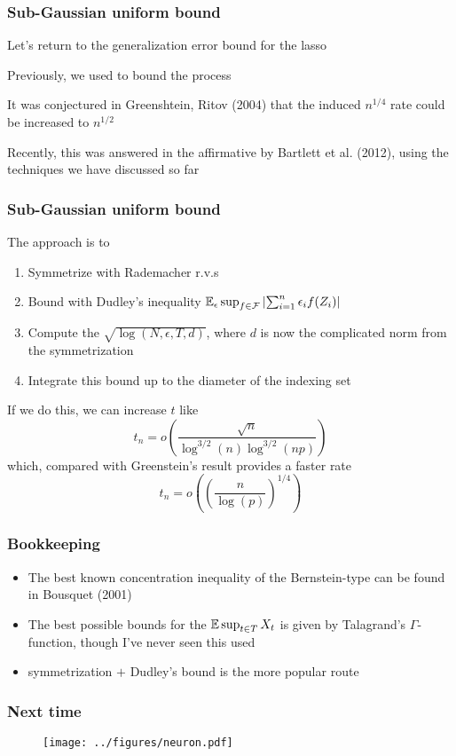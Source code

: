 \documentclass[12pt]{beamer}
\begin{document}
\begin{frame}[fragile]
\frametitle{Sub-Gaussian uniform bound}
Let's return to the generalization error bound for the lasso

\vsp
Previously, we used  to bound the process

\vsp
It was conjectured in Greenshtein, Ritov (2004) that the induced $n^{1/4}$ rate could be increased to $n^{1/2}$


\vsp
Recently, this was answered in the affirmative by Bartlett et al. (2012), using the techniques we have discussed so far

\end{frame}

\begin{frame}[fragile]
\frametitle{Sub-Gaussian uniform bound}
The approach is to
\begin{enumerate}
\item Symmetrize with Rademacher r.v.s
\item Bound with Dudley's inequality $\mathbb{E}_\epsilon \sup_{f\in \mathcal{F}} \left| \sum_{i=1}^n \epsilon_i f(Z_i) \right|$
\item Compute the $\sqrt{\log(N,\epsilon,T,d)}$, where $d$ is now the complicated norm from the symmetrization
\item Integrate this bound up to the diameter of the indexing set
\end{enumerate}

\vsp
If we do this, we can increase $t$ like
\[
t_n = o\left( \frac{\sqrt{n}}{\log^{3/2}(n) \log^{3/2}(n p)}\right)
\]
which, compared with Greenstein's result provides a faster rate
\[
t_n = o\left( \left(\frac{n}{\log( p)}\right)^{1/4}\right)
\]
\end{frame}

\begin{frame}[fragile]
\frametitle{Bookkeeping}
\begin{itemize}
\item The best known concentration inequality of the Bernstein-type can be found in Bousquet (2001)
\item The best possible bounds for the $\mathbb{E} \sup_{t \in T} X_t$ is given by Talagrand's $\Gamma$-function,
though I've never seen this used
\item symmetrization $+$ Dudley's bound is the more popular route
\end{itemize}

\end{frame}

\begin{frame}[fragile]
\frametitle{Next time}
\begin{figure}
\centering
\texttt{[image: ../figures/neuron.pdf]}
\end{figure}
\end{frame}
\end{document}
